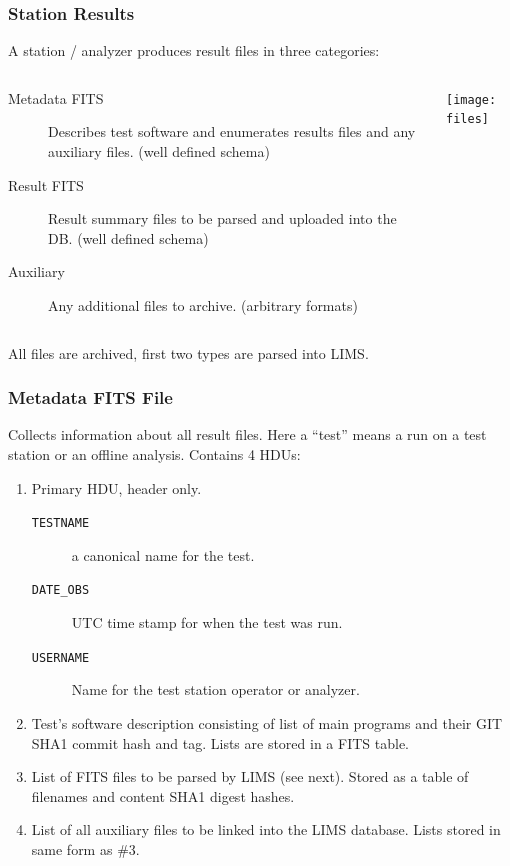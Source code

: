 \documentclass[xcolor=dvipsnames]{beamer}
\begin{document}
\begin{frame}
  \frametitle{Station Results}

  A station / analyzer produces result files in three categories:

  \begin{columns}
    \begin{column}{0.5\paperwidth}
      \footnotesize
      \begin{description}
      \item[Metadata FITS] Describes test software and enumerates results
        files and any auxiliary files.  (well defined schema)
      \item[Result FITS] Result summary files to be parsed and uploaded
        into the DB. (well defined schema)
      \item[Auxiliary] Any additional files to archive. (arbitrary
        formats)
      \end{description}
    \end{column}
    \begin{column}{0.4\paperwidth}
      \texttt{[image: files]}
    \end{column}
  \end{columns}
  All files are archived, first two types are parsed into LIMS.

\end{frame}

\begin{frame}
  \frametitle{Metadata FITS File} 

  Collects information about all result files.  Here a ``test'' means
  a run on a test station or an offline analysis.  Contains 4 HDUs:

  \begin{enumerate}
  \item Primary HDU, header only.
    \begin{description}
    \item[\texttt{TESTNAME}] a canonical name for the test.
    \item[\texttt{DATE\_OBS}] UTC time stamp for when the test was run.
    \item[\texttt{USERNAME}] Name for the test station operator or analyzer.
    \end{description}
  \item Test's software description consisting of list of main
    programs and their GIT SHA1 commit hash and tag.  Lists are stored
    in a FITS table.
  \item List of FITS files to be parsed by LIMS (see next).  Stored as
    a table of filenames and content SHA1 digest hashes.
  \item List of all auxiliary files to be linked into the LIMS
    database.  Lists stored in same form as \#3.
  \end{enumerate}

\end{frame}
\end{document}
